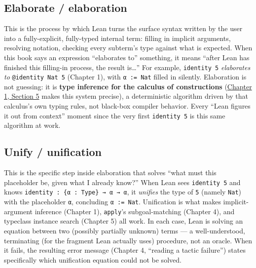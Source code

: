 \subsection{Elaborate / elaboration}\label{sec:01-basics:04-terminology:3}

This is the process by which Lean turns the surface syntax written by the user into a fully-explicit, fully-typed internal term: filling in implicit arguments, resolving notation, checking every subterm's type against what is expected. When this book says an expression ``elaborates to'' something, it means ``after Lean has finished this filling-in process, the result is\ldots{}'' For example, \texttt{identity 5} \emph{elaborates to} \texttt{@identity Nat 5} (Chapter 1), with \texttt{α := Nat} filled in silently. Elaboration is not guessing: it is \textbf{type inference for the calculus of constructions} (\hyperref[sec:01-basics:05-pi-sigma-and-coc:1]{Chapter 1, Section 5} makes this system precise), a deterministic algorithm driven by that calculus's own typing rules, not black-box compiler behavior. Every ``Lean figures it out from context'' moment since the very first \texttt{identity 5} is this same algorithm at work.

\subsection{Unify / unification}\label{sec:01-basics:04-terminology:4}

This is the specific step inside elaboration that solves ``what must this placeholder be, given what I already know?'' When Lean sees \texttt{identity 5} and knows \texttt{identity : \{α : Type\} → α → α}, it \emph{unifies} the type of \texttt{5} (namely \texttt{Nat}) with the placeholder \texttt{α}, concluding \texttt{α := Nat}. Unification is what makes implicit-argument inference (Chapter 1), \texttt{apply}'s subgoal-matching (Chapter 4), and typeclass instance search (Chapter 5) all work. In each case, Lean is solving an equation between two (possibly partially unknown) terms --- a well-understood, terminating (for the fragment Lean actually uses) procedure, not an oracle. When it fails, the resulting error message (Chapter 4, ``reading a tactic failure'') states specifically which unification equation could not be solved.

